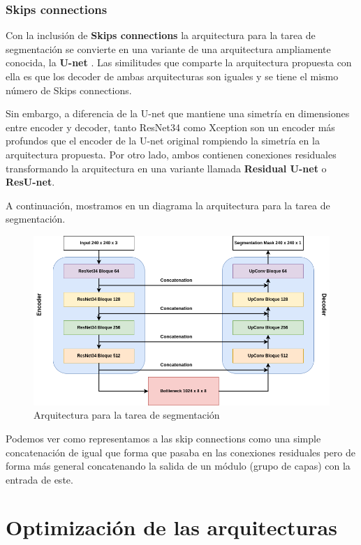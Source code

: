 \subsubsection{Skips connections} 

Con la inclusión de \textbf{Skips connections} la arquitectura para la tarea de segmentación se convierte en una variante de una arquitectura ampliamente conocida, la \textbf{U-net} \cite{ronneberger2015u}. Las similitudes que comparte la arquitectura propuesta con ella es que los decoder de ambas arquitecturas son iguales y se tiene el mismo número de Skips connections. 

Sin embargo, a diferencia de la U-net que mantiene una simetría en dimensiones entre encoder y decoder, tanto ResNet34 como Xception son un encoder más profundos que el encoder de la U-net original rompiendo la simetría en la arquitectura propuesta. Por otro lado, ambos contienen conexiones residuales transformando la arquitectura en una variante llamada \textbf{Residual U-net} o \textbf{ResU-net}. 

A continuación, mostramos en un diagrama la arquitectura para la tarea de segmentación.

\begin{figure}[H]
	\centering
	\includegraphics[width=1.0\linewidth]{imagenes/arquitectura_segmentacion.png}
	\caption{Arquitectura para la tarea de segmentación}
\end{figure}

Podemos ver como representamos a las skip connections como una simple concatenación de igual que forma que pasaba en las conexiones residuales pero de forma más general concatenando la salida de un módulo (grupo de capas) con la entrada de este.  


\section{Optimización de las arquitecturas}

